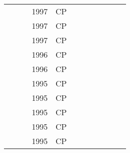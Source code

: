 \documentclass[a4paper]{article}
\begin{document}
{\begin{longtable}{p{3cm}p{6cm}rrcrlcccp{1.5cm}l}
& \href{papers/Caseau97.pdf}{} & \cite{Caseau97} & 1997 & CP & & & & & & & \\
& \href{papers/BaptisteP97.pdf}{} & \cite{BaptisteP97} & 1997 & CP & & & & & & & \\
& \href{papers/BeckDF97.pdf}{} & \cite{BeckDF97} & 1997 & CP & & & & & & & \\
& \href{papers/Colombani96.pdf}{} & \cite{Colombani96} & 1996 & CP & & & & & & & \\
& \href{papers/Zhou96.pdf}{} & \cite{Zhou96} & 1996 & CP & & & & & & & \\
& \href{papers/SimonisC95.pdf}{} & \cite{SimonisC95} & 1995 & CP & & & & & & & \\
& \href{papers/Goltz95.pdf}{} & \cite{Goltz95} & 1995 & CP & & & & & & & \\
& \href{papers/Simonis95.pdf}{} & \cite{Simonis95} & 1995 & CP & & & & & & & \\
& \href{papers/Puget95.pdf}{} & \cite{Puget95} & 1995 & CP & & & & & & & \\
& \href{papers/Touraivane95.pdf}{} & \cite{Touraivane95} & 1995 & CP & & & & & & & \\


\end{longtable}}
\end{document}
